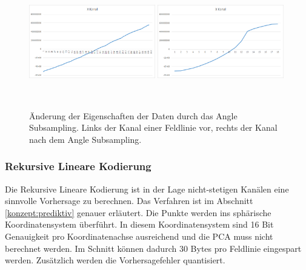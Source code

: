 \begin{figure}[!htbp]
	\center
	\includegraphics[width=0.49\textwidth,height=5cm,keepaspectratio]{./pictures/resultate/loesung2/variante1/channel_sub.png}
	\includegraphics[width=0.49\textwidth,height=5cm,keepaspectratio]{./pictures/resultate/loesung2/variante1/channel_angle.png}
	\caption{Änderung der Eigenschaften der Daten durch das Angle Subsampling. Links der Kanal einer Feldlinie vor, rechts der Kanal nach dem Angle Subsampling.}
	\label{resultate:loesung2:adaptive:channel}
\end{figure}

\subsubsection{Rekursive Lineare Kodierung} \label{resultate:loesung2:wavelet}
Die Rekursive Lineare Kodierung ist in der Lage nicht-stetigen Kanälen eine sinnvolle Vorhersage zu berechnen. Das Verfahren ist im Abschnitt \ref{konzept:prediktiv} genauer erläutert. Die Punkte werden ins sphärische Koordinatensystem überführt. In diesem Koordinatensystem sind 16 Bit Genauigkeit pro Koordinatenachse ausreichend und die PCA muss nicht berechnet werden. Im Schnitt können dadurch $30$ Bytes pro Feldlinie eingespart werden. Zusätzlich werden die Vorhersagefehler quantisiert.


